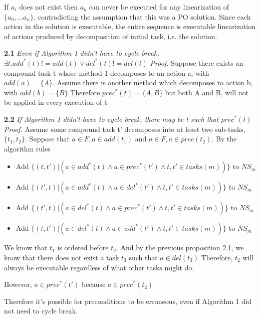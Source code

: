 	If $a_i$ does not exist then $a_k$ can never be executed for any linearization of $\{a_0, ...a_n\}$, contradicting the assumption that this was a PO solution. Since each action in the solution is executable, the entire sequence is executable linearization of actions produced by decomposition of initial task, i.e. the solution.
	

\textbf{2.1} \textit{Even if Algorithm 1 didn't have to cycle break, $\exists t. add^{*}(t) != add(t) \lor del^{*}(t) != del(t) $ }\newline
\textit{Proof.}
Suppose there exists an compound task t whose method 1 decomposes to an action a, with $add(a) = \{A\}$.
Assume there is another method which decomposes to action b, with $add(b) = \{B\}$
Therefore $prec^{*}(t) =\{A, B\} $ but both A and B, will not be applied in every execution of t.


\textbf{2.2} \textit{If Algorithm 1 didn't have to cycle break, there may be t such that $prec^{*}(t)$ } \newline
\textit{Proof.}
Assume some compound task t' decomposes into at least two sub-tasks, $\{t_1, t_2\}$. Suppose that $a \in F, a \in add(t_1)$ and
$a \in F, a \in prec(t_2)$. By the algorithm rules
\begin{itemize}			
		\item Add $\{ (t, t') |  (a \in add^{*}(t) \land a \in prec^{*}(t') \land t, t' \in tasks(m) ) \}$ to $NS_m$ 
		\item Add $\{ (t', t) |  (a \in add^{*}(t) \land a \in del^{*}(t') \land t, t' \in tasks(m) ) \}$ to $NS_m$ 
		\item Add $\{ (t', t) |  (a \in del^{*}(t) \land a \in prec^{*}(t') \land t, t' \in tasks(m) ) \}$ to $NS_m$ 
		\item Add $\{ (t, t') |  (a \in del^{*}(t) \land a \in add^{*}(t') \land t, t' \in tasks(m) ) \}$ to $NS_m$ 
\end{itemize}	
We know that $t_1$ is ordered before $t_2$. And by the previous proposition 2.1, we know that there does not exist a task $t_3$
such that $a \in del(t_3)$ Therefore, $t_2$ will always be executable regardless of what other tasks might do.

However, $a \in prec^{*}(t')$ because $a \in prec^{*}(t_2)$

Therefore it's possible for preconditions to be erroneous, even if Algorithm 1 did not need to cycle break.



